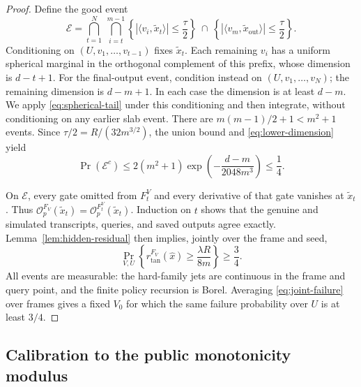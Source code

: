 \documentclass[11pt]{article}
\numberwithin{equation}{section}
\theoremstyle{definition}
\theoremstyle{remark}
\begin{document}
\begin{proof}
Define the good event
\[
\mathcal E=
\bigcap_{t=1}^{N}\ \bigcap_{i=t}^{m-1}
\left\{|\langle v_i,\widetilde x_t\rangle|\le\frac\tau2\right\}
\ \cap\
\left\{|\langle v_m,\widetilde x_{\mathrm{out}}\rangle|
\le\frac\tau2\right\}.
\]
Conditioning on $(U,v_1,\ldots,v_{t-1})$ fixes
$\widetilde x_t$. Each remaining $v_i$ has a uniform spherical marginal
in the orthogonal complement of this prefix, whose dimension is
$d-t+1$. For the final-output event, condition instead on
$(U,v_1,\ldots,v_N)$; the remaining dimension is $d-m+1$.
In each case the dimension is at least $d-m$. We apply
\eqref{eq:spherical-tail} under this conditioning and then integrate, without
conditioning on any earlier slab event. There are
$m(m-1)/2+1<m^2+1$ events. Since $\tau/2=R/(32m^{3/2})$, the union
bound and \eqref{eq:lower-dimension} yield
\[
\Pr(\mathcal E^c)
\le2(m^2+1)\exp\!\left(-\frac{d-m}{2048m^3}\right)
\le\frac14.
\]

On $\mathcal E$, every gate omitted from $F_t^V$ and every derivative
of that gate vanishes at $\widetilde x_t$. Thus
$\mathcal O_p^{F_V}(\widetilde x_t)
=\mathcal O_p^{F_t^V}(\widetilde x_t)$. Induction on $t$ shows that
the genuine and simulated transcripts, queries, and saved outputs agree
exactly. Lemma~\ref{lem:hidden-residual} then implies, jointly over the
frame and seed,
\begin{equation}\label{eq:joint-failure}
\Pr_{V,U}\!\left\{
r_{\mathrm{tan}}^{F_V}(\widehat x)
\ge\frac{\lambda R}{8m}\right\}\ge\frac34.
\end{equation}
All events are measurable: the hard-family jets are continuous in the
frame and query point, and the finite policy recursion is Borel.
Averaging \eqref{eq:joint-failure} over frames gives a fixed $V_0$ for which
the same failure probability over $U$ is at least $3/4$.
\end{proof}

\subsection{Calibration to the public monotonicity modulus}
\end{document}
